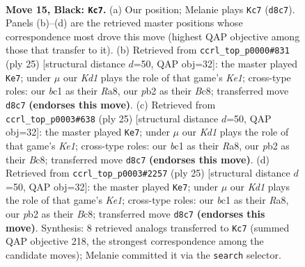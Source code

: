\documentclass[11pt]{article}
\begin{document}
\clearpage

\begin{figure}[p]\centering
\begin{subfigure}{0.46\textwidth}\centering
\resizebox{\linewidth}{!}{%
\newchessgame
\chessboard[
  setfen={r2k1b1r/pp4pp/5p2/4pP1P/P1P1n3/8/1P3P2/R1B1KB1R b KQ - 0 15},
  showmover=false,
  pgfstyle=straightmove, color=movearrow, markmove={d8-c7}
]}
\caption{}
\end{subfigure}\hfill
\begin{subfigure}{0.46\textwidth}\centering
\resizebox{\linewidth}{!}{%
\newchessgame
\chessboard[
  setfen={r1b1k2r/pp1n1ppp/4p3/3pP3/3N1P2/8/PPP3PP/R3KB1R b KQkq - 0 13},
  showmover=false,
  pgfstyle=straightmove, color=movearrow, markmove={e8-e7}
]}
\caption{}
\end{subfigure}
\\[4pt]
\begin{subfigure}{0.46\textwidth}\centering
\resizebox{\linewidth}{!}{%
\newchessgame
\chessboard[
  setfen={r1b1k2r/pp1n1ppp/4p3/3pP3/3N1P2/8/PPP3PP/R3KB1R b KQkq - 0 13},
  showmover=false,
  pgfstyle=straightmove, color=movearrow, markmove={e8-e7}
]}
\caption{}
\end{subfigure}\hfill
\begin{subfigure}{0.46\textwidth}\centering
\resizebox{\linewidth}{!}{%
\newchessgame
\chessboard[
  setfen={r1b1k2r/pp1n1ppp/4p3/3pP3/3N1P2/8/PPP3PP/R3KB1R b KQkq - 0 13},
  showmover=false,
  pgfstyle=straightmove, color=movearrow, markmove={e8-e7}
]}
\caption{}
\end{subfigure}
\caption{\textbf{Move 15, Black: \texttt{Kc7}.} (a) Our position; Melanie plays \texttt{Kc7} (\texttt{d8c7}). Panels (b)--(d) are the retrieved master positions whose correspondence most drove this move (highest QAP objective among those that transfer to it). (b) Retrieved from \texttt{ccrl\_top\_p0000\#831} (ply 25) [structural distance $d$=50, QAP obj=32]: the master played \texttt{Ke7}; under $\mu$ our \emph{Kd1} plays the role of that game's \emph{Ke1}; cross-type roles: our \emph{b}c1 as their \emph{R}a8, our \emph{p}b2 as their \emph{B}c8; transferred move \texttt{d8c7} \textbf{(endorses this move)}. (c) Retrieved from \texttt{ccrl\_top\_p0003\#638} (ply 25) [structural distance $d$=50, QAP obj=32]: the master played \texttt{Ke7}; under $\mu$ our \emph{Kd1} plays the role of that game's \emph{Ke1}; cross-type roles: our \emph{b}c1 as their \emph{R}a8, our \emph{p}b2 as their \emph{B}c8; transferred move \texttt{d8c7} \textbf{(endorses this move)}. (d) Retrieved from \texttt{ccrl\_top\_p0003\#2257} (ply 25) [structural distance $d$=50, QAP obj=32]: the master played \texttt{Ke7}; under $\mu$ our \emph{Kd1} plays the role of that game's \emph{Ke1}; cross-type roles: our \emph{b}c1 as their \emph{R}a8, our \emph{p}b2 as their \emph{B}c8; transferred move \texttt{d8c7} \textbf{(endorses this move)}. Synthesis: 8 retrieved analogs transferred to \texttt{Kc7} (summed QAP objective 218, the strongest correspondence among the candidate moves); Melanie committed it via the \texttt{search} selector.}
\label{fig:thought-m29}
\end{figure}
\end{document}
